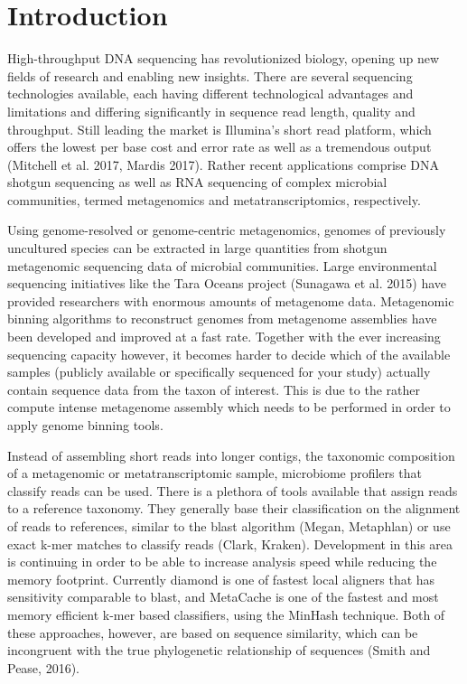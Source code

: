 \documentclass{bioinfo}
\begin{document}
\maketitle

\section{Introduction}
High-throughput DNA sequencing has revolutionized biology, opening up new fields of research and enabling new insights. There are several sequencing technologies available, each having different technological advantages and limitations and differing significantly in sequence read length, quality and throughput. Still leading the market is Illumina’s short read platform, which offers the lowest per base cost and error rate as well as a tremendous output (Mitchell et al. 2017, Mardis 2017). Rather recent applications comprise DNA shotgun sequencing as well as RNA sequencing of complex microbial communities, termed metagenomics and metatranscriptomics, respectively. 

Using genome-resolved or genome-centric metagenomics, genomes of previously uncultured species can be extracted in large quantities from shotgun metagenomic sequencing data of microbial communities. Large environmental sequencing initiatives like the Tara Oceans project (Sunagawa et al. 2015) have provided researchers with enormous amounts of metagenome data. Metagenomic binning algorithms to reconstruct genomes from metagenome assemblies have been developed and improved at a fast rate. Together with the ever increasing sequencing capacity however, it becomes harder to decide which of the available samples (publicly available or specifically sequenced for your study) actually contain sequence data from the taxon of interest. This is due to the rather compute intense metagenome assembly which needs to be performed in order to apply genome binning tools.

Instead of assembling short reads into longer contigs, the taxonomic composition of a metagenomic or metatranscriptomic sample, microbiome profilers that classify reads can be used. There is a plethora of tools available that assign reads to a reference taxonomy. They generally base their classification on the alignment of reads to references, similar to the blast algorithm (Megan, Metaphlan) or use exact k-mer matches to classify reads (Clark, Kraken). Development in this area is continuing in order to be able to increase analysis speed while reducing the memory footprint. Currently diamond is one of fastest local aligners that has sensitivity comparable to blast, and MetaCache is one of the fastest and most memory efficient k-mer based classifiers, using the MinHash technique. Both of these approaches, however, are based on sequence similarity, which can be incongruent with the true phylogenetic relationship of sequences (Smith and Pease, 2016).
\end{document}
